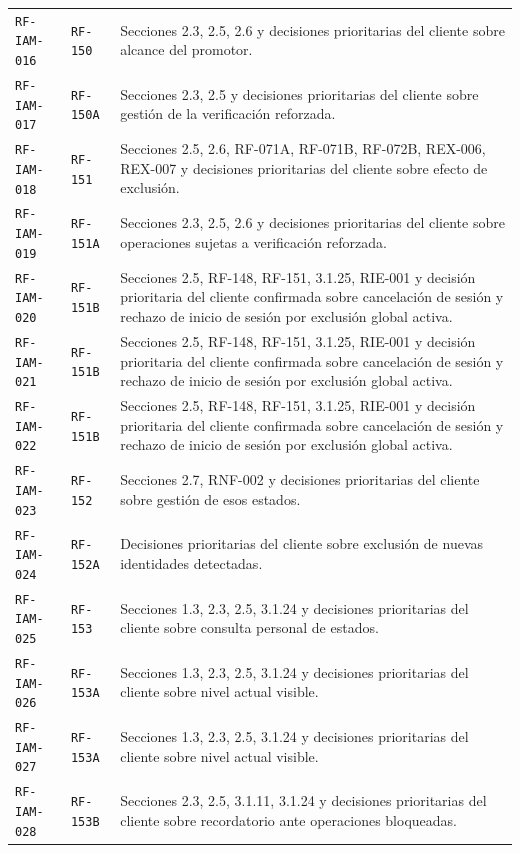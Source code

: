 \documentclass[10pt,letterpaper]{article}
\begin{document}
\begin{landscape}
\begin{longtable}{P{2.7cm}P{2.6cm}P{15.7cm}}
\texttt{RF-IAM-016} & \texttt{RF-150} & Secciones 2.3, 2.5, 2.6 y decisiones prioritarias del cliente sobre alcance del promotor.\\
\texttt{RF-IAM-017} & \texttt{RF-150A} & Secciones 2.3, 2.5 y decisiones prioritarias del cliente sobre gestión de la verificación reforzada.\\
\texttt{RF-IAM-018} & \texttt{RF-151} & Secciones 2.5, 2.6, RF-071A, RF-071B, RF-072B, REX-006, REX-007 y decisiones prioritarias del cliente sobre efecto de exclusión.\\
\texttt{RF-IAM-019} & \texttt{RF-151A} & Secciones 2.3, 2.5, 2.6 y decisiones prioritarias del cliente sobre operaciones sujetas a verificación reforzada.\\
\texttt{RF-IAM-020} & \texttt{RF-151B} & Secciones 2.5, RF-148, RF-151, 3.1.25, RIE-001 y decisión prioritaria del cliente confirmada sobre cancelación de sesión y rechazo de inicio de sesión por exclusión global activa.\\
\texttt{RF-IAM-021} & \texttt{RF-151B} & Secciones 2.5, RF-148, RF-151, 3.1.25, RIE-001 y decisión prioritaria del cliente confirmada sobre cancelación de sesión y rechazo de inicio de sesión por exclusión global activa.\\
\texttt{RF-IAM-022} & \texttt{RF-151B} & Secciones 2.5, RF-148, RF-151, 3.1.25, RIE-001 y decisión prioritaria del cliente confirmada sobre cancelación de sesión y rechazo de inicio de sesión por exclusión global activa.\\
\texttt{RF-IAM-023} & \texttt{RF-152} & Secciones 2.7, RNF-002 y decisiones prioritarias del cliente sobre gestión de esos estados.\\
\texttt{RF-IAM-024} & \texttt{RF-152A} & Decisiones prioritarias del cliente sobre exclusión de nuevas identidades detectadas.\\
\texttt{RF-IAM-025} & \texttt{RF-153} & Secciones 1.3, 2.3, 2.5, 3.1.24 y decisiones prioritarias del cliente sobre consulta personal de estados.\\
\texttt{RF-IAM-026} & \texttt{RF-153A} & Secciones 1.3, 2.3, 2.5, 3.1.24 y decisiones prioritarias del cliente sobre nivel actual visible.\\
\texttt{RF-IAM-027} & \texttt{RF-153A} & Secciones 1.3, 2.3, 2.5, 3.1.24 y decisiones prioritarias del cliente sobre nivel actual visible.\\
\texttt{RF-IAM-028} & \texttt{RF-153B} & Secciones 2.3, 2.5, 3.1.11, 3.1.24 y decisiones prioritarias del cliente sobre recordatorio ante operaciones bloqueadas.\\

\end{longtable}
\end{landscape}
\end{document}
